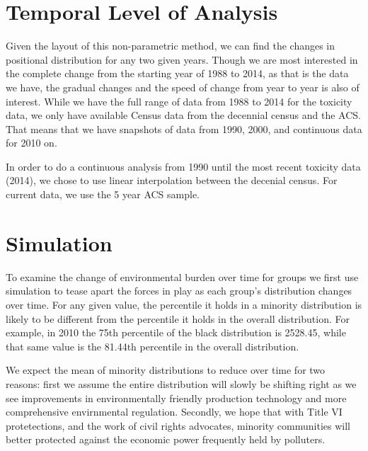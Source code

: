 \documentclass[12pt,twoside]{dukestatscithesis}
\theoremstyle{definition}
\theoremstyle{definition}
\theoremstyle{definition}
\theoremstyle{remark}
\begin{document}
\section{Temporal Level of Analysis}\label{temporal-level-of-analysis}

Given the layout of this non-parametric method, we can find the changes
in positional distribution for any two given years. Though we are most
interested in the complete change from the starting year of 1988 to
2014, as that is the data we have, the gradual changes and the speed of
change from year to year is also of interest. While we have the full
range of data from 1988 to 2014 for the toxicity data, we only have
available Census data from the decennial census and the ACS. That means
that we have snapshots of data from 1990, 2000, and continuous data for
2010 on.

In order to do a continuous analysis from 1990 until the most recent
toxicity data (2014), we chose to use linear interpolation between the
decenial census. For current data, we use the 5 year ACS sample.

\section{Simulation}\label{simulation}

To examine the change of environmental burden over time for groups we
first use simulation to tease apart the forces in play as each group's
distribution changes over time. For any given value, the percentile it
holds in a minority distribution is likely to be different from the
percentile it holds in the overall distribution. For example, in 2010
the 75th percentile of the black distribution is 2528.45, while that
same value is the 81.44th percentile in the overall distribution.

We expect the mean of minority distributions to reduce over time for two
reasons: first we assume the entire distribution will slowly be shifting
right as we see improvements in environmentally friendly production
technology and more comprehensive envirnmental regulation. Secondly, we
hope that with Title VI protetections, and the work of civil rights
advocates, minority communities will better protected against the
economic power frequently held by polluters.
\end{document}
